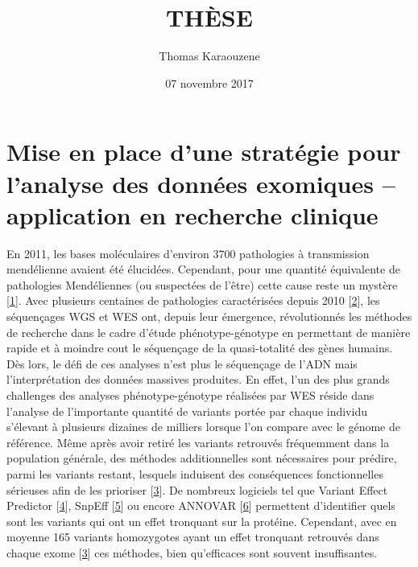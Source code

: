 \documentclass[12pt,twoside]{ugathesis}
\title{THÈSE}
\author{Thomas Karaouzene}
\date{07 novembre 2017}
\begin{document}
  \maketitle

\frontmatter %
\pagestyle{empty} %



  \hypersetup{linkcolor=black}
  \setcounter{tocdepth}{3}
  \tableofcontents

  \listoftables

  \listoffigures



\mainmatter %
\pagestyle{fancyplain} %

\chapter{Mise en place d'une stratégie pour l'analyse des données
exomiques -- application en recherche
clinique}\label{mise-en-place-dune-strategie-pour-lanalyse-des-donnees-exomiques-application-en-recherche-clinique}

\newpage

En 2011, les bases moléculaires d'environ 3700 pathologies à
transmission mendélienne avaient été élucidées. Cependant, pour une
quantité équivalente de pathologies Mendéliennes (ou suspectées de
l'être) cette cause reste un mystère
{[}\protect\hyperlink{ref-Amberger2011}{1}{]}. Avec plusieurs centaines
de pathologies caractérisées depuis 2010
{[}\protect\hyperlink{ref-Ng}{2}{]}, les séquençages WGS et WES ont,
depuis leur émergence, révolutionnés les méthodes de recherche dans le
cadre d'étude phénotype-génotype en permettant de manière rapide et à
moindre cout le séquençage de la quasi-totalité des gènes humains. Dès
lors, le défi de ces analyses n'est plus le séquençage de l'ADN mais
l'interprétation des données massives produites. En effet, l'un des plus
grands challenges des analyses phénotype-génotype réalisées par WES
réside dans l'analyse de l'importante quantité de variants portée par
chaque individu s'élevant à plusieurs dizaines de milliers lorsque l'on
compare avec le génome de référence. Même après avoir retiré les
variants retrouvés fréquemment dans la population générale, des méthodes
additionnelles sont nécessaires pour prédire, parmi les variants
restant, lesquels induisent des conséquences fonctionnelles sérieuses
afin de les prioriser {[}\protect\hyperlink{ref-Pelak2010}{3}{]}. De
nombreux logiciels tel que Variant Effect Predictor
{[}\protect\hyperlink{ref-McLaren2016}{4}{]}, SnpEff
{[}\protect\hyperlink{ref-Cingolani2012}{5}{]} ou encore ANNOVAR
{[}\protect\hyperlink{ref-Wang2010}{6}{]} permettent d'identifier quels
sont les variants qui ont un effet tronquant sur la protéine. Cependant,
avec en moyenne 165 variants homozygotes ayant un effet tronquant
retrouvés dans chaque exome {[}\protect\hyperlink{ref-Pelak2010}{3}{]}
ces méthodes, bien qu'efficaces sont souvent insuffisantes.
\end{document}
